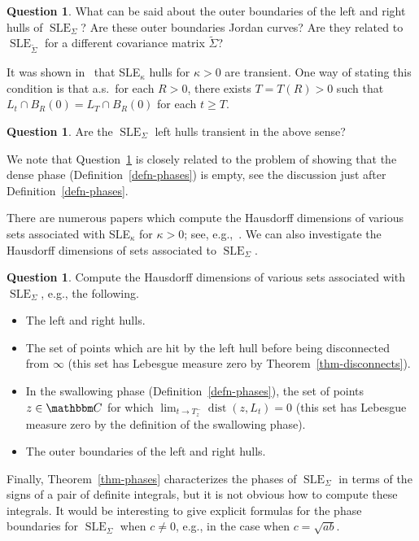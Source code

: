 \documentclass[11pt]{article}
\theoremstyle{plain}
\theoremstyle{definition}
\newtheorem{ques}[thm]{Question}
\numberwithin{equation}{section}
\newcommand{\BB}{\mathbbm}
\newcommand{\op}{\operatorname}
\newcommand{\rta}{\rightarrow}
\newcommand{\wt}{\widetilde}
\newcommand{\SLEG}{{\operatorname{SLE}}_\Sigma}
\newcommand{\SLEGt}{{\operatorname{SLE}}_{\wt\Sigma}}
\begin{document}
\begin{ques}
What can be said about the outer boundaries of the left and right hulls of $\SLEG$? Are these outer boundaries Jordan curves? Are they related to $\SLEGt$ for a different covariance matrix $\wt \Sigma$? 
\end{ques}

It was shown in~\cite{lawler-werness-multipoint} that SLE$_\kappa$ hulls for $\kappa > 0$ are transient. One way of stating this condition is that a.s.\ for each $R > 0$, there exists $T = T(R) > 0$ such that $L_t \cap B_R(0) = L_T \cap B_R(0)$ for each $t\geq T$. 

\begin{ques} \label{ques-transient}
Are the $\SLEG$ left hulls transient in the above sense?
\end{ques} 

We note that Question~\ref{ques-transient} is closely related to the problem of showing that the dense phase (Definition~\ref{defn-phases}) is empty, see the discussion just after Definition~\ref{defn-phases}. 

There are numerous papers which compute the Hausdorff dimensions of various sets associated with SLE$_\kappa$ for $\kappa > 0$; see, e.g.,~\cite{beffara-dim,alberts-shef-bdy-dim,miller-wu-dim}. We can also investigate the Hausdorff dimensions of sets associated to $\SLEG$. 

\begin{ques}
Compute the Hausdorff dimensions of various sets associated with $\SLEG$, e.g., the following. 
\begin{itemize}
\item The left and right hulls.
\item The set of points which are hit by the left hull before being disconnected from $\infty$ (this set has Lebesgue measure zero by Theorem~\ref{thm-disconnects}).
\item In the swallowing phase (Definition~\ref{defn-phases}), the set of points $z\in\BB C$ for which $\lim_{t\rta T_z^-} \op{dist}(z,L_t) = 0$ (this set has Lebesgue measure zero by the definition of the swallowing phase). 
\item The outer boundaries of the left and right hulls. 
\end{itemize} 
\end{ques}



Finally, Theorem~\ref{thm-phases} characterizes the phases of $\SLEG$ in terms of the signs of a pair of definite integrals, but it is not obvious how to compute these integrals.  It would be interesting to give explicit formulas for the phase boundaries for $\SLEG$ when $c \neq 0$, e.g., in the case when $c = \sqrt{ab}$.
\end{document}
